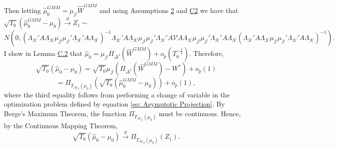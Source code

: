 \documentclass{article}
\begin{document}
Then letting $\hat{\mu}_0^{GMM} = \mu_{\mathcal{J}}\hat{W}^{GMM}$ and using Assumptions \hyperref[A2]{2} and \hyperref[AC2]{C2} we have that $ \sqrt{T_0}(\hat{\mu}_0^{GMM} - \mu_0) \overset{d}{\rightarrow} Z_1 \sim$
$$N(0, (\Lambda_{\mathcal{K}}' A \Lambda_{\mathcal{K}} \mu_{\mathcal{J}} \mu_{\mathcal{J}}' \Lambda_{\mathcal{K}}' A \Lambda_{\mathcal{K}})^{-1} \Lambda_{\mathcal{K}}' A \Lambda_{\mathcal{K}} \mu_{\mathcal{J}} \mu_{\mathcal{J}}' \Lambda_{\mathcal{K}}' A \mathcal{V} A \Lambda_{\mathcal{K}} \mu_{\mathcal{J}} \mu_{\mathcal{J}}' \Lambda_{\mathcal{K}}' A \Lambda_{\mathcal{K}} (\Lambda_{\mathcal{K}}' A \Lambda_{\mathcal{K}} \mu_{\mathcal{J}} \mu_{\mathcal{J}}' \Lambda_{\mathcal{K}}' A \Lambda_{\mathcal{K}})^{-1}).$$
I show in Lemma \hyperref[LC2]{C.2} that $\hat{\mu}_0 = \mu_{\mathcal{J}} \Pi_{\Delta^J}(\hat{W}^{GMM}) + o_p(T_0^{-\frac{1}{2}})$. Therefore, 
$$\sqrt{T_0}(\hat{\mu}_0 - \mu_0) = \sqrt{T_0}\mu_{\mathcal{J}}(\Pi_{\Delta^J} (\hat{W}^{GMM}) - W^*) + o_p(1) $$
$$= \Pi_{T_{\mathcal{M}_{\mathcal{J}}}(\mu_0)}(\sqrt{T_0}(\hat{\mu}_0^{GMM} - \mu_0)) + o_p(1),$$
where the third equality follows from performing a change of variable in the optimization problem defined by equation \eqref{eq: Asymptotic Projection}. By Berge’s Maximum Theorem, the function 
 $\Pi_{T_{\mathcal{M}_{\mathcal{J}}}(\mu_0)}$ must be continuous. Hence, by the Continuous Mapping Theorem,
$$\sqrt{T_0}(\hat{\mu}_0 - \mu_0) \overset{d}{\rightarrow} 
 \Pi_{T_{\mathcal{M}_{\mathcal{J}}}(\mu_0)}(Z_1).$$
\end{document}

